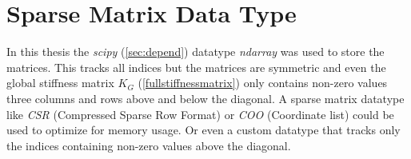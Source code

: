 \section{Sparse Matrix Data Type}
\label{sec:sparsematrix}

In this thesis the \textit{scipy} (\cref{sec:depend}) datatype \textit{ndarray} was used to store the matrices. This tracks all indices but the matrices are symmetric and even the global stiffness matrix $K_G$ (\cref{fullstiffnessmatrix}) only contains non-zero values three columns and rows above and below the diagonal.
A sparse matrix datatype like \textit{CSR} (Compressed Sparse Row Format) or \textit{COO} (Coordinate list) could be used to optimize for memory usage.
Or even a custom datatype that tracks only the indices containing non-zero values above the diagonal.
